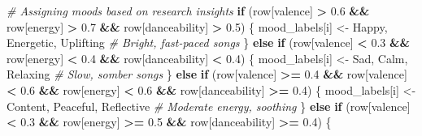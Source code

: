 \documentclass[
]{article}
\newenvironment{Shaded}{\begin{snugshade}}{\end{snugshade}}
\newcommand{\CommentTok}[1]{\textcolor[rgb]{0.56,0.35,0.01}{\textit{#1}}}
\newcommand{\ControlFlowTok}[1]{\textcolor[rgb]{0.13,0.29,0.53}{\textbf{#1}}}
\newcommand{\FloatTok}[1]{\textcolor[rgb]{0.00,0.00,0.81}{#1}}
\newcommand{\NormalTok}[1]{#1}
\newcommand{\OtherTok}[1]{\textcolor[rgb]{0.56,0.35,0.01}{#1}}
\newcommand{\SpecialCharTok}[1]{\textcolor[rgb]{0.81,0.36,0.00}{\textbf{#1}}}
\newcommand{\StringTok}[1]{\textcolor[rgb]{0.31,0.60,0.02}{#1}}
\begin{document}
\begin{Shaded}
\begin{Highlighting}[]
  \CommentTok{\# Assigning moods based on research insights}
  \ControlFlowTok{if}\NormalTok{ (row[}\StringTok{\textquotesingle{}valence\textquotesingle{}}\NormalTok{] }\SpecialCharTok{\textgreater{}} \FloatTok{0.6} \SpecialCharTok{\&\&}\NormalTok{ row[}\StringTok{\textquotesingle{}energy\textquotesingle{}}\NormalTok{] }\SpecialCharTok{\textgreater{}} \FloatTok{0.7} \SpecialCharTok{\&\&}\NormalTok{ row[}\StringTok{\textquotesingle{}danceability\textquotesingle{}}\NormalTok{] }\SpecialCharTok{\textgreater{}} \FloatTok{0.5}\NormalTok{) \{}
\NormalTok{    mood\_labels[i] }\OtherTok{\textless{}{-}} \StringTok{\textquotesingle{}Happy, Energetic, Uplifting\textquotesingle{}}  \CommentTok{\# Bright, fast{-}paced songs}
\NormalTok{  \} }\ControlFlowTok{else} \ControlFlowTok{if}\NormalTok{ (row[}\StringTok{\textquotesingle{}valence\textquotesingle{}}\NormalTok{] }\SpecialCharTok{\textless{}} \FloatTok{0.3} \SpecialCharTok{\&\&}\NormalTok{ row[}\StringTok{\textquotesingle{}energy\textquotesingle{}}\NormalTok{] }\SpecialCharTok{\textless{}} \FloatTok{0.4} \SpecialCharTok{\&\&}\NormalTok{ row[}\StringTok{\textquotesingle{}danceability\textquotesingle{}}\NormalTok{] }\SpecialCharTok{\textless{}} \FloatTok{0.4}\NormalTok{) \{}
\NormalTok{    mood\_labels[i] }\OtherTok{\textless{}{-}} \StringTok{\textquotesingle{}Sad, Calm, Relaxing\textquotesingle{}}  \CommentTok{\# Slow, somber songs}
\NormalTok{  \} }\ControlFlowTok{else} \ControlFlowTok{if}\NormalTok{ (row[}\StringTok{\textquotesingle{}valence\textquotesingle{}}\NormalTok{] }\SpecialCharTok{\textgreater{}=} \FloatTok{0.4} \SpecialCharTok{\&\&}\NormalTok{ row[}\StringTok{\textquotesingle{}valence\textquotesingle{}}\NormalTok{] }\SpecialCharTok{\textless{}} \FloatTok{0.6} \SpecialCharTok{\&\&}\NormalTok{ row[}\StringTok{\textquotesingle{}energy\textquotesingle{}}\NormalTok{] }\SpecialCharTok{\textless{}} \FloatTok{0.6} \SpecialCharTok{\&\&}\NormalTok{ row[}\StringTok{\textquotesingle{}danceability\textquotesingle{}}\NormalTok{] }\SpecialCharTok{\textgreater{}=} \FloatTok{0.4}\NormalTok{) \{}
\NormalTok{    mood\_labels[i] }\OtherTok{\textless{}{-}} \StringTok{\textquotesingle{}Content, Peaceful, Reflective\textquotesingle{}}  \CommentTok{\# Moderate energy, soothing}
\NormalTok{  \} }\ControlFlowTok{else} \ControlFlowTok{if}\NormalTok{ (row[}\StringTok{\textquotesingle{}valence\textquotesingle{}}\NormalTok{] }\SpecialCharTok{\textless{}} \FloatTok{0.3} \SpecialCharTok{\&\&}\NormalTok{ row[}\StringTok{\textquotesingle{}energy\textquotesingle{}}\NormalTok{] }\SpecialCharTok{\textgreater{}=} \FloatTok{0.5} \SpecialCharTok{\&\&}\NormalTok{ row[}\StringTok{\textquotesingle{}danceability\textquotesingle{}}\NormalTok{] }\SpecialCharTok{\textgreater{}=} \FloatTok{0.4}\NormalTok{) \{}

\end{Highlighting}
\end{Shaded}
\end{document}

